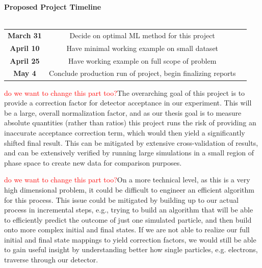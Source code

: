 \documentclass{article}
\begin{document}
\begin{center}
\textbf{Proposed Project Timeline}\\~\\
\begin{tabular}{ c c c }
  \textbf{March 31} & Decide on optimal ML method for this project \\
  \textbf{April 10} & Have minimal working example on small dataset  \\  
  \textbf{April 25} & Have working example on full scope of problem \\ 
  \textbf{May 4} & Conclude production run of project, begin finalizing reports
\end{tabular}
\end{center}

\quad \textcolor{red}{do we want to change this part too?}The overarching goal of this project is to provide a correction factor for detector acceptance in our experiment. This will be a large, overall normalization factor, and as our thesis goal is to measure absolute quantities (rather than ratios) this project runs the risk of providing an inaccurate acceptance correction term, which would then yield a significantly shifted final result. This can be mitigated by extensive cross-validation of results, and can be extensively verified by running large simulations in a small region of phase space to create new data for comparison purposes.

\quad \textcolor{red}{do we want to change this part too?}On a more technical level, as this is a very high dimensional problem, it could be difficult to engineer an efficient algorithm for this process. This issue could be mitigated by building up to our actual process in incremental steps, e.g., trying to build an algorithm that will be able to efficiently predict the outcome of just one simulated particle, and then build onto more complex initial and final states. If we are not able to realize our full initial and final state mappings to yield correction factors, we would still be able to gain useful insight by understanding better how single particles, e.g. electrons, traverse through our detector. 
\end{document}

